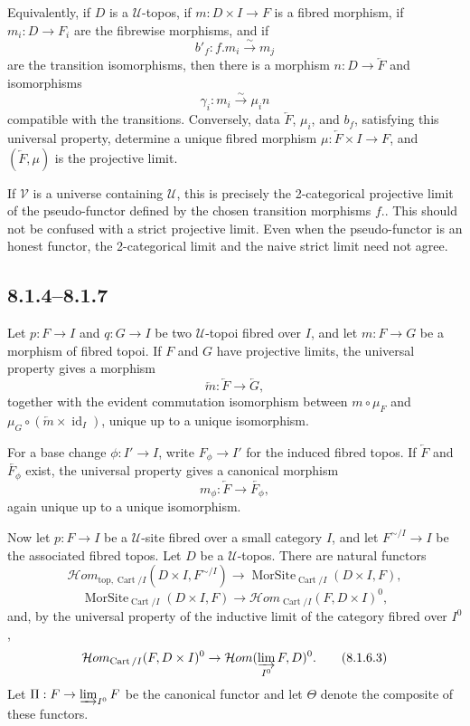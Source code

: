 \documentclass[11pt]{article}
\newcommand{\U}{\mathcal{U}}
\newcommand{\V}{\mathcal{V}}
\newcommand{\id}{\operatorname{id}}
\newcommand{\Cart}{\operatorname{Cart}}
\begin{document}
Equivalently, if \(D\) is a \(\U\)-topos, if \(m:D\times I\to F\) is a fibred morphism, if \(m_i:D\to F_i\) are the fibrewise morphisms, and if
\[
 b'_f:f.m_i\xrightarrow{\sim}m_j
\]
are the transition isomorphisms, then there is a morphism \(n:D\to\overleftarrow F\) and isomorphisms
\[
 \gamma_i:m_i\xrightarrow{\sim}\mu_i n
\]
compatible with the transitions. Conversely, data \(\overleftarrow F\), \(\mu_i\), and \(b_f\), satisfying this universal property, determine a unique fibred morphism \(\mu:\overleftarrow F\times I\to F\), and \((\overleftarrow F,\mu)\) is the projective limit.

If \(\V\) is a universe containing \(\U\), this is precisely the 2-categorical projective limit of the pseudo-functor defined by the chosen transition morphisms \(f.\). This should not be confused with a strict projective limit. Even when the pseudo-functor is an honest functor, the 2-categorical limit and the naive strict limit need not agree.

\subsection*{8.1.4--8.1.7}
Let \(p:F\to I\) and \(q:G\to I\) be two \(\U\)-topoi fibred over \(I\), and let \(m:F\to G\) be a morphism of fibred topoi. If \(F\) and \(G\) have projective limits, the universal property gives a morphism
\[
 \overleftarrow m:\overleftarrow F\to\overleftarrow G, \tag{8.1.4.1}
\]
together with the evident commutation isomorphism between \(m\circ\mu_F\) and \(\mu_G\circ(\overleftarrow m\times\id_I)\), unique up to a unique isomorphism.

For a base change \(\phi:I'\to I\), write \(F_\phi\to I'\) for the induced fibred topos. If \(\overleftarrow F\) and \(\overleftarrow{F_
\phi}\) exist, the universal property gives a canonical morphism
\[
 m_
\phi:\overleftarrow F\to\overleftarrow{F_
\phi},
\]
again unique up to a unique isomorphism.

Now let \(p:F\to I\) be a \(\U\)-site fibred over a small category \(I\), and let \(F^{\sim/I}\to I\) be the associated fibred topos. Let \(D\) be a \(\U\)-topos. There are natural functors
\[
\mathcal{H}om_{\mathrm{top},\Cart/I}(D\times I,F^{\sim/I})
 \to \operatorname{MorSite}_{\Cart/I}(D\times I,F), \tag{8.1.6.1}
\]
\[
\operatorname{MorSite}_{\Cart/I}(D\times I,F)\to
 \mathcal{H}om_{\Cart/I}(F,D\times I)^0, \tag{8.1.6.2}
\]
and, by the universal property of the inductive limit of the category fibred over \(I^0\),
\[
\mathcal{H}om_{\Cart/I}(F,D\times I)^0\to
\mathcal{H}om(\varinjlim_{I^0}F,D)^0. \tag{8.1.6.3}
\]
Let \(\Pi:F\to\varinjlim_{I^0}F\) be the canonical functor and let \(\Theta\) denote the composite of these functors.
\end{document}
